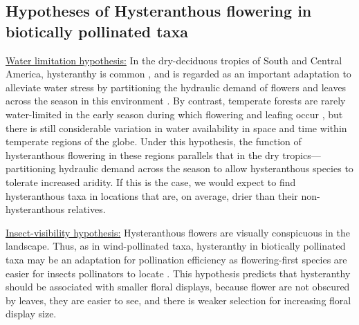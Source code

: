 \documentclass{article}[11pt]
\begin{document}

\subsection*{Hypotheses of Hysteranthous flowering in biotically pollinated taxa}

\underline{Water limitation hypothesis:} In the dry-deciduous tropics of South and Central America, hysteranthy is common \citep{Rathcke_1985,Franklin2016}, and is regarded as an important adaptation to alleviate water stress by partitioning the hydraulic demand of flowers and leaves across the season in this environment \citep{Gougherty2018,Franklin2016,Borchert1983,Reich1984}. By contrast,
temperate forests are rarely water-limited in the early season during which flowering and leafing occur \citep{Polgar2011}, but there is still considerable variation in water availability in space and time within temperate regions of the globe. Under this hypothesis, the function of hysteranthous flowering in these regions parallels that in the dry tropics---partitioning hydraulic demand across the season to allow hysteranthous species to tolerate increased aridity. If this is the case, we would expect to find hysteranthous taxa in locations that are, on average, drier than their non-hysteranthous relatives.

\underline{Insect-visibility hypothesis:} Hysteranthous flowers are visually conspicuous in the landscape. Thus, as in wind-pollinated taxa, hysteranthy in biotically pollinated taxa may be an adaptation for pollination efficiency as flowering-first species are easier for insects pollinators to locate \citep{Janzen1967}. This hypothesis predicts that hysteranthy should be associated with smaller floral displays, because flower are not obscured by leaves, they are easier to see, and there is weaker selection for increasing floral display size. %
\end{document}
